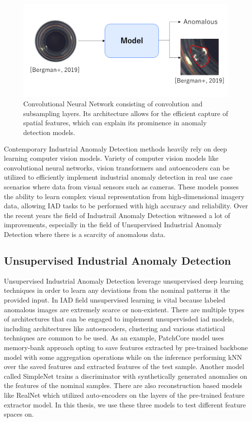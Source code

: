 \begin{figure}[h]
	\begin{center}
		\includegraphics[width=0.8\linewidth]{Chapter_2/iad.png}
	\end{center}
	\caption{Convolutional Neural Network consisting of convolution and subsampling layers. Its architecture allows for the efficient capture of spatial features, which can explain its prominence in anomaly detection models.}
	\captionsetup{belowskip=0pt}
	\label{fig:cnn}
\end{figure}

Contemporary Industrial Anomaly Detection methods heavily rely on deep learning computer vision models. Variety of computer vision models like convolutional neural networks, vision transformers and autoencoders can be utilized to efficiently implement industrial anomaly detection in real use case scenarios where data from visual sensors such as cameras. These models posses the ability to learn complex visual representation from high-dimensional imagery data, allowing IAD tasks to be performed with high accuracy and reliability. Over the recent years the field of Industrail Anomaly Detection witnessed a lot of improvements, especially in the field of Unsupervised Industrial Anomaly Detection where there is a scarcity of anomalous data. 

\clearpage
\subsection{Unsupervised Industrial Anomaly Detection}
\label{unsupervised iad}
Unsupervised Industrial Anomaly Detection leverage unsupervised deep learning techniques in order to learn any deviations from the nominal patterns it the provided input. In IAD field unsupervised learning is vital because labeled anomalous images are extremely scarce or non-existent. There are multiple types of architectures that can be engaged to implement unsupervisded iad models, including architectures like autoencoders, clustering and various statistical techniques are common to be used. As an example, PatchCore model uses memory-bank approach opting to save features extracted by pre-trained backbone model with some aggregation operations while on the inference performing kNN over the saved features and extracted features of the test sample. Another model called SimpleNet trains a discriminator with synthetically generated anomalies on the features of the nominal samples. There are also reconstruction based models like RealNet which utilized auto-encoders on the layers of the pre-trained feature extractor model. In this thesis, we use these three models to test different feature spaces on.

